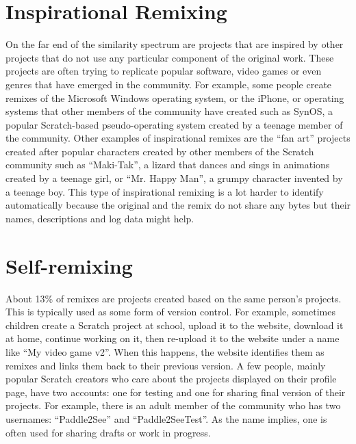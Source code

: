 \section{Inspirational Remixing}
On the far end of the similarity spectrum are projects that are inspired by other projects that do not use any particular component of the original work.
These projects are often trying to replicate popular software, video games or even genres that have emerged in the community.
For example, some people create remixes of the Microsoft Windows operating system, or the iPhone, or operating systems that other members of the community have created such as SynOS, a popular Scratch-based pseudo-operating system created by a teenage member of the community.
Other examples of inspirational remixes are the ``fan art'' projects created after popular characters created by other members of the Scratch community such as ``Maki-Tak'', a lizard that dances and sings in animations created by a teenage girl,  or  ``Mr. Happy Man'', a grumpy character invented by a teenage boy.
This type of inspirational remixing is a lot harder to identify automatically because the original and the remix do not share any bytes but their names, descriptions and log data might help. 

\section{Self-remixing}
About 13\% of remixes are projects created based on the same person's projects.
This is typically used as some form of version control.
For example, sometimes children create a Scratch project at school, upload it to the website, download it at home, continue working on it, then re-upload it to the website under a name like ``My video game v2''.
When this happens, the website identifies them as remixes and links them back to their previous version.
A few people, mainly popular Scratch creators who care about the projects displayed on their profile page, have two accounts: one for testing and one for sharing final version of their projects.
For example, there is an adult member of the community who has two usernames: ``Paddle2See'' and ``Paddle2SeeTest''.
As the name implies, one is often used for sharing drafts or work in progress.
 
